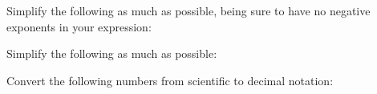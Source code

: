 \documentclass[12pt,letterpaper]{exam}
\begin{document}
\begin{questions}
\newpage
\question[8] Simplify the following as much as possible, being sure to have no negative exponents in your expression: \pspace
{}





\newpage
\question[6] Simplify the following as much as possible: \pspace
{}





\newpage
\question[6] Convert the following numbers from scientific to decimal notation: \pspace
\begin{parts}

\end{parts}
\end{questions}
\end{document}
